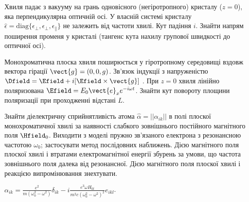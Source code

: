 \begin{problem}
Хвиля падає з вакууму на грань одновісного (негіротропного) кристалу ($z = 0$), яка перпендикулярна оптичній осі. У власній системі кристалу $\hat{\epsilon} = \mathrm{diag}\{\epsilon_\bot, \epsilon_\bot, \epsilon_\parallel\}$  не залежить від частоти хвилі. Кут падіння $i$. Знайти напрям поширення променя у кристалі (тангенс кута нахилу групової швидкості до оптичної осі).
\end{problem}

\begin{problem}
Монохроматична плоска хвиля поширюється у гіротропному середовищі вздовж вектора гірації $\vect{g} = (0,0,g)$. Зв’язок індукції з напруженістю $\Dfield = \Efield + i[\Efield \times \vect{g} ]$ . При $z= 0$ хвиля лінійно поляризована $\Efield = E_0\vect{e}_x e^{- i\omega t}$. Знайти кут повороту площини поляризації при проходженні відстані $L$.
\end{problem}

\begin{problem}%
Знайти діелектричну сприйнятливість атома $\hat\alpha = || \alpha_{ik} ||$ в полі плоскої
монохроматичної хвилі за наявності слабкого зовнішнього постійного магнітного поля $\Hfield_0$.
Виходити з моделі пружно зв'язаного електрона з резонансною частотою $\omega_0$; застосувати метод
послідовних наближень. Дією магнітного поля плоскої хвилі і втратами електромагнітної енергії збурень
за умови, що частота зовнішнього поля далека від резонансної. Дією магнітного поля плоскої хвилі і
реакцією випромінювання знехтувати.
\begin{solution}
	$\alpha_{ik} = \frac{e^2}{m(\omega_0^2 - \omega^2)}\delta_{ik} - i \frac{e^3\omega
	H_{0l}}{m^2c(\omega_0^2 - \omega^2)^2}e_{ikl}$.
\end{solution}
\end{problem}

